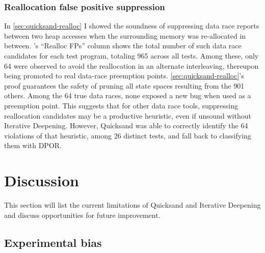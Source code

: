 \subsubsection{Reallocation false positive suppression}

In \cref{sec:quicksand-realloc} I showed the soundness of
suppressing data race reports between two heap accesses when the surrounding memory was re-allocated in between.
's ``Realloc FPs'' column shows the total number of such data race candidates for each test program,
totaling 965 across all tests.
Among these, only 64 were observed to avoid the reallocation in an alternate interleaving,
thereupon being promoted to real data-race preemption points.
\cref{sec:quicksand-realloc}'s proof guarantees the safety of pruning all state spaces resulting from the 901 others.
%
Among the 64 true data races, %
none exposed a new bug when used as a preemption point.
This suggests that for other data race tools,
suppressing reallocation candidates may be a productive heuristic,
even if unsound without Iterative Deepening.
However, Quicksand was able to correctly identify the 64 violations of that heuristic, among 26 distinct tests,
and fall back to classifying them with DPOR.


\section{Discussion}
\label{sec:quicksand-discussion}

This section will list the current limitations of Quicksand and Iterative Deepening
and discuss opportunities for future improvement.

\subsection{Experimental bias}

